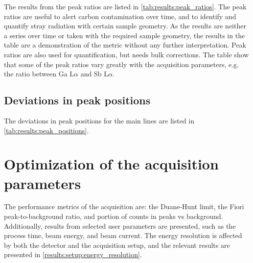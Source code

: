 The results from the peak ratios are listed in \cref{tab:results:peak_ratios}.
The peak ratios are useful to alert carbon contamination over time, and to identify and quantify stray radiation with certain sample geometry.
As the results are neither a series over time or taken with the required sample geometry, the results in the table are a demonstration of the metric without any further interpretation.
Peak ratios are also used for quantification, but needs bulk corrections.
The table show that some of the peak ratios vary greatly with the acquisition parameters, e.g. the ratio between Ga L$\alpha$ and Sb L$\alpha$.








\subsection*{Deviations in peak positions}
\label{results:setup:peak_positions}

The deviations in peak positions for the main lines are listed in \cref{tab:results:peak_positions}.






















\section{Optimization of the acquisition parameters}
\label{results:acquisition_parameters}

The performance metrics of the acquisition are: the Duane-Hunt limit, the Fiori peak-to-background ratio, and portion of counts in peaks vs background.
Additionally, results from selected user parameters are presented, such as the process time, beam energy, and beam current.
The energy resolution is affected by both the detector and the acquisition setup, and the relevant results are presented in \cref{results:setup:energy_resolution}.



